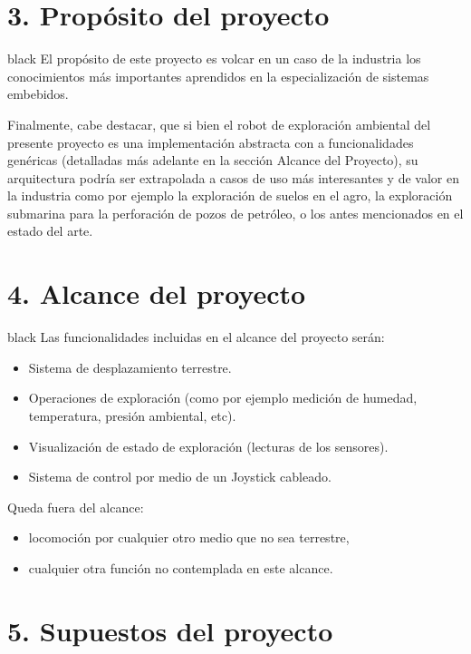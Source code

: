 \documentclass[
11pt, %
]{charter}
\begin{document}
\section{3. Propósito del proyecto}
\label{sec:proposito}

\begin{consigna}{black}
El propósito de este proyecto es volcar en un caso de la industria los conocimientos más importantes aprendidos en la especialización de sistemas embebidos.

Finalmente, cabe destacar, que si bien el robot de exploración ambiental del presente proyecto es una implementación abstracta con a funcionalidades genéricas (detalladas más adelante en la sección Alcance del Proyecto), su arquitectura podría ser extrapolada a casos de uso más interesantes y de valor en la industria como por ejemplo la exploración de suelos en el agro, la exploración submarina para la perforación de pozos de petróleo, o los antes mencionados en el estado del arte.

\end{consigna}

\section{4. Alcance del proyecto}
\label{sec:alcance}

\begin{consigna}{black}
Las funcionalidades incluidas en el alcance del proyecto serán:
\begin{itemize}
	\item Sistema de desplazamiento terrestre.
	\item Operaciones de exploración (como por ejemplo medición de humedad, temperatura, presión ambiental, etc).
	\item Visualización de estado de exploración (lecturas de los sensores).
	\item Sistema de control por medio de un Joystick cableado.
\end{itemize}

Queda fuera del alcance:
\begin{itemize}
	\item locomoción por cualquier otro medio que no sea terrestre,
	\item cualquier otra función no contemplada en este alcance.
\end{itemize}
\end{consigna}


\section{5. Supuestos del proyecto}
\label{sec:supuestos}
\end{document}
